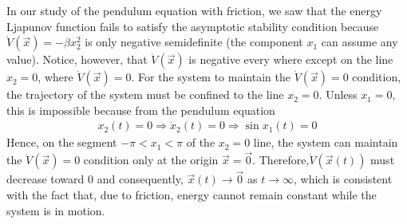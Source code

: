 \documentclass[12pt,a4paper,oneside]{book}
\begin{document}
\begin{onehalfspace}
In our study of the pendulum equation with friction, we saw that the energy 
Ljapunov function fails to satisfy the asymptotic stability condition because 
$\dot{V}(\vec{x}) = -\beta x_2^2$ is only negative semidefinite (the component 
$x_1$ can assume any value). Notice, however, that $\dot{V}(\vec{x})$ is 
negative every where except on the line $x_2=0$, where $\dot{V}(\vec{x})=0$. 
For the system to maintain the $\dot{V}(\vec{x})=0$ condition, the trajectory 
of the system must be confined to the line $x_2=0$. Unless $x_1=0$, this is 
impossible because from the pendulum equation 
\begin{equation*}
	\begin{aligned}
		x_2(t)=0 \Rightarrow\dot{x}_2(t)=0 \Rightarrow\sin x_1(t)=0
	\end{aligned}
\end{equation*}
Hence, on the segment $-\pi<x_1<\pi$ of the $x_2=0$ line, the system can 
maintain the $\dot{V}(\vec{x})=0$ condition only at the origin 
$\vec{x}=\vec{0}$. Therefore,$\dot{V}(\vec{x}(t))$ must decrease toward 0 and 
consequently, $\vec{x}(t)\rightarrow\vec{0}$ as $t\rightarrow\infty$, which is 
consistent with the fact that, due to friction, energy cannot remain constant 
while the system is in motion. 


\end{onehalfspace}
\end{document}
